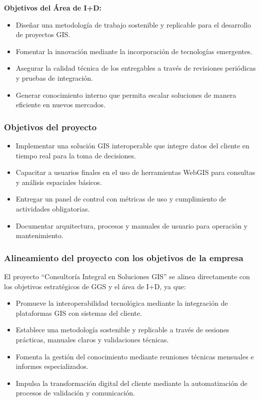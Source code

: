 \textbf{Objetivos del Área de I+D:}
\begin{itemize}
  \item Diseñar una metodología de trabajo sostenible y replicable para el desarrollo de proyectos GIS.
  \item Fomentar la innovación mediante la incorporación de tecnologías emergentes.
  \item Asegurar la calidad técnica de los entregables a través de revisiones periódicas y pruebas de integración.
  \item Generar conocimiento interno que permita escalar soluciones de manera eficiente en nuevos mercados.
\end{itemize}

\subsubsection{Objetivos del proyecto}
\begin{itemize}
  \item Implementar una solución GIS interoperable que integre datos del cliente en tiempo real para la toma de decisiones.
  \item Capacitar a usuarios finales en el uso de herramientas WebGIS para consultas y análisis espaciales básicos.
  \item Entregar un panel de control con métricas de uso y cumplimiento de actividades obligatorias.
  \item Documentar arquitectura, procesos y manuales de usuario para operación y mantenimiento.
\end{itemize}

\subsubsection{Alineamiento del proyecto con los objetivos de la empresa}
El proyecto ``Consultoría Integral en Soluciones GIS'' se alinea directamente con los objetivos estratégicos de GGS y el área de I+D, ya que:
\begin{itemize}
  \item Promueve la interoperabilidad tecnológica mediante la integración de plataformas GIS con sistemas del cliente.
  \item Establece una metodología sostenible y replicable a través de sesiones prácticas, manuales claros y validaciones técnicas.
  \item Fomenta la gestión del conocimiento mediante reuniones técnicas mensuales e informes especializados.
  \item Impulsa la transformación digital del cliente mediante la automatización de procesos de validación y comunicación.
\end{itemize}

